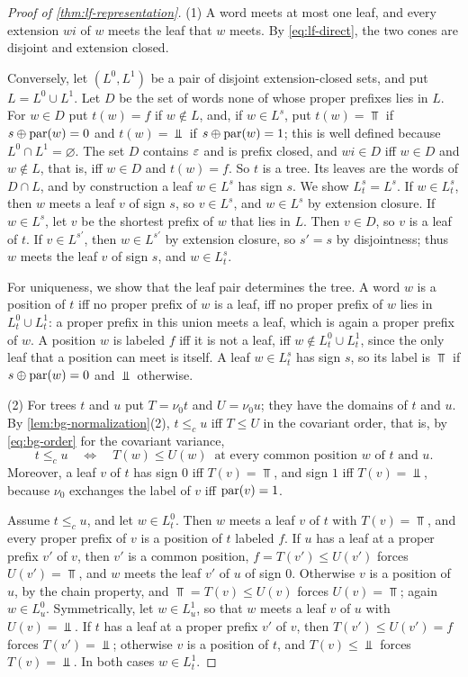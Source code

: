 \begin{proof}[Proof of \cref{thm:lf-representation}]
(1) A word meets at most one leaf, and every extension $wi$ of $w$ meets the
leaf that $w$ meets. By \cref{eq:lf-direct}, the two cones are disjoint and
extension closed.

Conversely, let $(L^0,L^1)$ be a pair of disjoint extension-closed sets, and
put $L=L^0\cup L^1$. Let $D$ be the set of words none of whose proper
prefixes lies in $L$. For $w\in D$ put $t(w)=f$ if $w\notin L$, and, if
$w\in L^s$, put $t(w)=\Top$ if $s\oplus\operatorname{par}(w)=0$ and $t(w)=\Bot$ if
$s\oplus\operatorname{par}(w)=1$; this is well defined because $L^0\cap L^1=\varnothing$.
The set $D$ contains $\varepsilon$ and is prefix closed, and $wi\in D$ iff $w\in D$
and $w\notin L$, that is, iff $w\in D$ and $t(w)=f$. So $t$ is a tree. Its
leaves are the words of $D\cap L$, and by construction a leaf $w\in L^s$ has
sign $s$. We show $L^s_t=L^s$. If $w\in L^s_t$, then $w$ meets a leaf $v$ of
sign $s$, so $v\in L^s$, and $w\in L^s$ by extension closure. If $w\in L^s$,
let $v$ be the shortest prefix of $w$ that lies in $L$. Then $v\in D$, so $v$
is a leaf of $t$. If $v\in L^{s'}$, then $w\in L^{s'}$ by extension closure,
so $s'=s$ by disjointness; thus $w$ meets the leaf $v$ of sign $s$, and
$w\in L^s_t$.

For uniqueness, we show that the leaf pair determines the tree. A word $w$ is
a position of $t$ iff no proper prefix of $w$ is a leaf, iff no proper prefix
of $w$ lies in $L^0_t\cup L^1_t$: a proper prefix in this union meets a leaf,
which is again a proper prefix of $w$. A position $w$ is labeled $f$ iff it
is not a leaf, iff $w\notin L^0_t\cup L^1_t$, since the only leaf that a
position can meet is itself. A leaf $w\in L^s_t$ has sign $s$, so its label
is $\Top$ if $s\oplus\operatorname{par}(w)=0$ and $\Bot$ otherwise.

(2) For trees $t$ and $u$ put $T=\nu_0t$ and $U=\nu_0u$; they have the
domains of $t$ and $u$. By \cref{lem:bg-normalization}(2), $t\le_c u$ iff
$T\le U$ in the covariant order, that is, by \cref{eq:bg-order} for the
covariant variance,
\[
 t\le_c u\quad\Longleftrightarrow\quad T(w)\le U(w)\ \text{ at every common
 position $w$ of $t$ and $u$.}
\]
Moreover, a leaf $v$ of $t$ has sign $0$ iff $T(v)=\Top$, and sign $1$ iff
$T(v)=\Bot$, because $\nu_0$ exchanges the label of $v$ iff
$\operatorname{par}(v)=1$.

Assume $t\le_c u$, and let $w\in L^0_t$. Then $w$ meets a leaf $v$ of $t$
with $T(v)=\Top$, and every proper prefix of $v$ is a position of $t$ labeled
$f$. If $u$ has a leaf at a proper prefix $v'$ of $v$, then $v'$ is a common
position, $f=T(v')\le U(v')$ forces $U(v')=\Top$, and $w$ meets the leaf $v'$
of $u$ of sign $0$. Otherwise $v$ is a position of $u$, by the chain property,
and $\Top=T(v)\le U(v)$ forces $U(v)=\Top$; again $w\in L^0_u$. Symmetrically,
let $w\in L^1_u$, so that $w$ meets a leaf $v$ of $u$ with $U(v)=\Bot$. If $t$
has a leaf at a proper prefix $v'$ of $v$, then $T(v')\le U(v')=f$ forces
$T(v')=\Bot$; otherwise $v$ is a position of $t$, and $T(v)\le\Bot$ forces
$T(v)=\Bot$. In both cases $w\in L^1_t$.


\end{proof}
